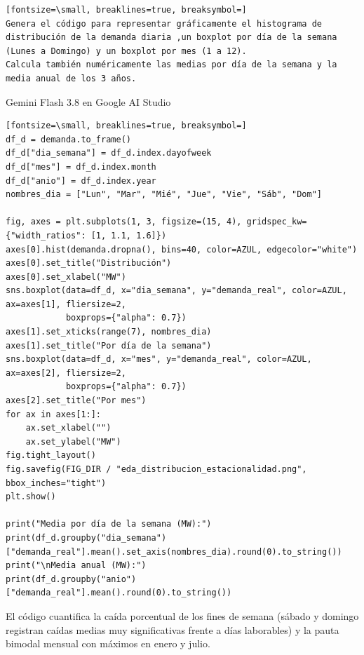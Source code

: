 \documentclass[12pt,a4paper,oneside]{book}
\begin{document}
\begin{iaprompt}
\begin{Verbatim}[fontsize=\small, breaklines=true, breaksymbol=]
Genera el código para representar gráficamente el histograma de distribución de la demanda diaria ,un boxplot por día de la semana (Lunes a Domingo) y un boxplot por mes (1 a 12).
Calcula también numéricamente las medias por día de la semana y la media anual de los 3 años.
\end{Verbatim}
\end{iaprompt}
\begin{iaresp}{Gemini Flash 3.8 en Google AI Studio}
\begin{Verbatim}[fontsize=\small, breaklines=true, breaksymbol=]
df_d = demanda.to_frame()
df_d["dia_semana"] = df_d.index.dayofweek
df_d["mes"] = df_d.index.month
df_d["anio"] = df_d.index.year
nombres_dia = ["Lun", "Mar", "Mié", "Jue", "Vie", "Sáb", "Dom"]

fig, axes = plt.subplots(1, 3, figsize=(15, 4), gridspec_kw={"width_ratios": [1, 1.1, 1.6]})
axes[0].hist(demanda.dropna(), bins=40, color=AZUL, edgecolor="white")
axes[0].set_title("Distribución")
axes[0].set_xlabel("MW")
sns.boxplot(data=df_d, x="dia_semana", y="demanda_real", color=AZUL, ax=axes[1], fliersize=2,
            boxprops={"alpha": 0.7})
axes[1].set_xticks(range(7), nombres_dia)
axes[1].set_title("Por día de la semana")
sns.boxplot(data=df_d, x="mes", y="demanda_real", color=AZUL, ax=axes[2], fliersize=2,
            boxprops={"alpha": 0.7})
axes[2].set_title("Por mes")
for ax in axes[1:]:
    ax.set_xlabel("")
    ax.set_ylabel("MW")
fig.tight_layout()
fig.savefig(FIG_DIR / "eda_distribucion_estacionalidad.png", bbox_inches="tight")
plt.show()

print("Media por día de la semana (MW):")
print(df_d.groupby("dia_semana")["demanda_real"].mean().set_axis(nombres_dia).round(0).to_string())
print("\nMedia anual (MW):")
print(df_d.groupby("anio")["demanda_real"].mean().round(0).to_string())
\end{Verbatim}
\end{iaresp}
\begin{iaanalisis}
El código cuantifica la caída porcentual de los fines de semana (sábado y domingo registran caídas medias muy significativas frente a días laborables) y la pauta bimodal mensual con máximos en enero y julio.
\end{iaanalisis}
\end{document}

